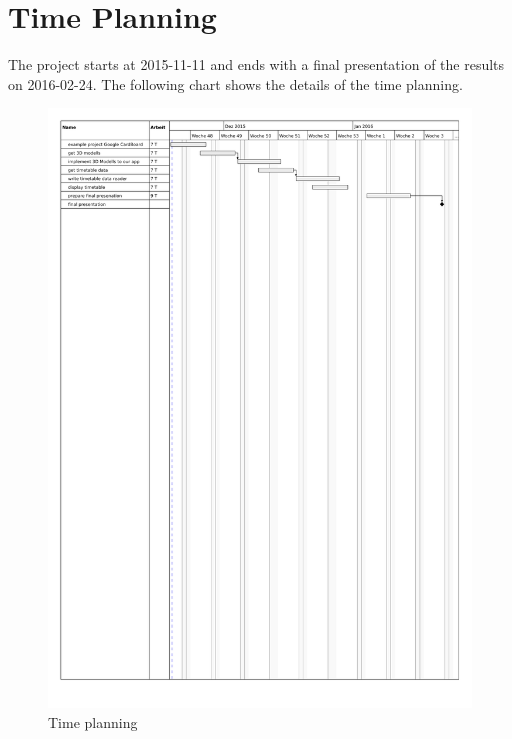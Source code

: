 \documentclass[]{report}
\begin{document}
\section{Time Planning}
The project starts at 2015-11-11 and ends with a final presentation of the results on 2016-02-24. The following chart shows the details of the time planning.
\newpage
\begin{figure}[h!]
\centering
\includegraphics[scale=0.9,angle=90,origin=c]{ganttChart}
\caption{Time planning}
\label{fig:method}
\end{figure}
\end{document}
